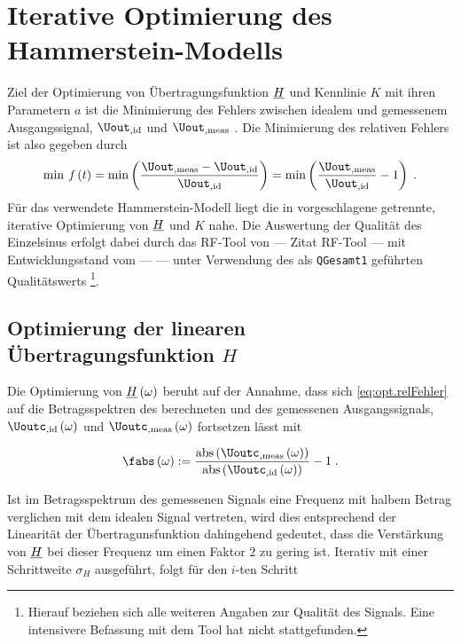 \documentclass[../Report.tex]{subfiles}
\begin{document}
\chapter{Iterative Optimierung des Hammerstein-Modells}
\label{chap:opt}

Ziel der Optimierung von Übertragungsfunktion $\underline{H}$ und Kennlinie $K$ mit ihren Parametern $a$ ist die Minimierung des Fehlers zwischen idealem und gemessenem Ausgangssignal, $\Uout_{, \mathrm{id}}$ und $\Uout_{, \mathrm{meas}}$ . Die Minimierung des relativen Fehlers ist also gegeben durch
\begin{align}
\label{eq:opt.relFehler}
	\min \; \mathit{f} \oft = \min \left( \frac{\Uout_{, \mathrm{meas}}  - \Uout_{, \mathrm{id}} }{ \Uout_{, \mathrm{id}} } \right) 
	= \min \left( \frac{ \Uout_{, \mathrm{meas}}}{ \Uout_{, \mathrm{id}}} -1 \right) 
	\; .
\end{align}
Für das verwendete Hammerstein-Modell liegt die in \cite{----Jens---} %
vorgeschlagene getrennte, iterative Optimierung von $\underline{H}$ und $K$ nahe. 
Die Auswertung der Qualität des Einzelsinus erfolgt dabei durch das RF-Tool von --- Zitat RF-Tool --- mit Entwicklungsstand vom --- --- unter Verwendung des als \lstinline{QGesamt1} geführten Qualitätswerts \footnote{\label{foot:opt.H.quality} Hierauf beziehen sich alle weiteren Angaben zur Qualität des Signals. Eine intensivere Befassung mit dem Tool hat nicht stattgefunden.}.


\section{Optimierung der linearen Übertragungsfunktion $H$}
\label{sec:opt.H}

Die Optimierung von $\underline{H} \left( \omega \right)$ beruht auf der Annahme, dass sich \eqref{eq:opt.relFehler} auf die Betragsspektren des berechneten und des gemessenen Ausgangssignals, $\Uoutc_{, \mathrm{id}} \ofomega $ und $\Uoutc_{, \mathrm{meas}} \ofomega $ fortsetzen lässt mit 

\begin{align}
\label{eq:opt.ratio}
	\fabs \ofomega :=  
				\frac{\mathrm{abs} \left( \Uoutc_{, \mathrm{meas}} \ofomega \right)}{\mathrm{abs} \left(\Uoutc_{, \mathrm{id}} \ofomega \right)} -1
				\; .
\end{align} 

Ist im Betragsspektrum des gemessenen Signals eine Frequenz mit halbem Betrag verglichen mit dem idealen Signal vertreten, wird dies entsprechend der Linearität der Übertragunsfunktion dahingehend gedeutet, dass die Verstärkung von $\underline{H}$ bei dieser Frequenz um einen Faktor $2$ zu gering ist.
Iterativ mit einer Schrittweite $\sigma_H$ ausgeführt, folgt für den $i$-ten Schritt
\end{document}

